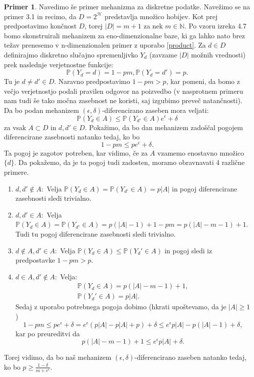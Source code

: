 \documentclass[12pt,a4paper]{amsart}
\theoremstyle{definition} %
\newtheorem{primer}[definicija]{Primer}
\theoremstyle{plain} %
\begin{document}
\begin{primer}
Navedimo še primer mehanizma za diskretne podatke. Navežimo se na primer 3.1 in recimo, da $D=2^{\mathcal{H}}$ predstavlja množico hobijev. Kot prej predpostavimo končnost $D$, torej $|D| = m + 1$ za nek $m \in \mathbb{N}$. Po vzoru izreka 4.7 bomo skonstruirali mehanizem za eno-dimenzionalne baze, ki ga lahko nato brez težav prenesemo v n-dimenzionalen primer z uporabo \eqref{product}.
\newline
\newline
Za $d \in D$ definirajmo diskretno slučajno spremenljivko $Y_d$ (zavzame $|D|$ možnih vrednosti) prek naslednje verjetnostne funkcije:
$$\mathbb{P}(Y_d=d) = 1 - pm, \mathbb{P}(Y_d=d') = p.$$
Tu je $d \neq d' \in D$. Naravno predpostavimo $1 - pm > p$, kar pomeni, da bomo z večjo verjetnostjo podali pravilen odgovor na poizvedbo (v nasprotnem primeru nam tudi še tako močna zasebnost ne koristi, saj izgubimo preveč natančnosti).
\newline
\newline
Da bo podan mehanizem $(\epsilon, \delta)$-diferencirano zaseben mora veljati:
\begin{equation}
\mathbb{P}(Y_d \in A) \leq \mathbb{P}(Y_{d'} \in A)e^{\epsilon} + \delta
\end{equation}
za vsak $A \subset D$ in $d, d' \in D$.
\newline
\newline
Pokažimo, da bo dan mehanizem zadoščal pogojem diferencirane zasebnosti natanko tedaj, ko bo $$1 - pm \leq pe^{\epsilon} + \delta.$$ Ta pogoj je zagotov potreben, kar vidimo, če za $A$ vzamemo enostavno množico $\{d\}$. Da pokažemo, da je ta pogoj tudi zadosten, moramo obravnavati 4 različne primere.
\begin{enumerate}
\item $d,d' \notin A: $ Velja $\mathbb{P}(Y_d \in A) = \mathbb{P}(Y_{d'} \in A)= p|A|$ in pogoj diferencirane zasebnosti sledi trivialno.
\item $d,d' \in A: $ Velja $\mathbb{P}(Y_d \in A) = \mathbb{P}(Y_{d'} \in A) = p(|A| - 1) + 1 - pm=p(|A| -m -1) + 1$. Tudi tu pogoj diferencirane zasebnosti sledi trivialno.
\item $d \notin A,d' \in A: $ Velja $\mathbb{P}(Y_d \in A) \leq \mathbb{P}(Y_d' \in A)$ in pogoj sledi iz predpostavke $1 - pm > p$.
\item  $d \in A, d' \notin A: $ Velja:
\begin{gather*}
\mathbb{P}(Y_d \in A) = p(|A| -m -1) + 1, \\
\mathbb{P}(Y_d' \in A) = p|A|.
\end{gather*}
Sedaj z uporabo potrebnega pogoja dobimo (hkrati upoštevamo, da je $|A| \geq 1$)
$$1-pm\leq pe^{\epsilon} + \delta = e^{\epsilon}(p|A|-p|A|+p)+\delta \leq e^{\epsilon}p|A|-p(|A|-1)+\delta,$$
kar po preureditvi da 
$$p(|A| -m -1) + 1 \leq e^{\epsilon}p|A| + \delta.$$
\end{enumerate}
Torej vidimo, da bo naš mehanizem $(\epsilon, \delta)$-diferencirano zaseben natanko tedaj, ko bo $p \geq \frac{1-\delta}{m+e^{\epsilon}}$.

\end{primer}
\end{document}
